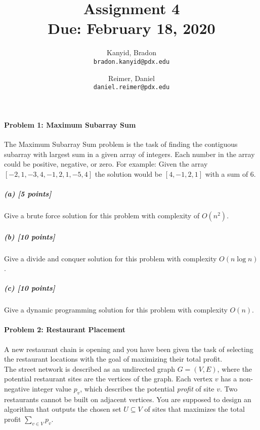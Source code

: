\documentclass[11pt]{article}
\title{\bf Assignment 4 \\[2ex]
\rm\normalsize Due: February 18, 2020}
\date{}
\author{
  Kanyid, Bradon\\
  \texttt{bradon.kanyid@pdx.edu}
  \and
  Reimer, Daniel\\
  \texttt{daniel.reimer@pdx.edu}
}
\begin{document}
\maketitle

\begin{center}
\end{center}

\paragraph{Problem 1: Maximum Subarray Sum}
The Maximum Subarray Sum problem is the task of finding the contiguous subarray with largest sum in a given array of integers.
Each number in the array could be positive, negative, or zero. For example: Given the array $[-2, 1, -3, 4, -1, 2, 1, -5, 4]$
the solution would be $[4, -1, 2, 1]$ with a sum of 6.

\subparagraph{(a) [5 points]}
Give a brute force solution for this problem with complexity of $O(n^2)$.


\subparagraph{(b) [10 points]}
Give a divide and conquer solution for this problem with complexity $O(n \log n)$.


\subparagraph{(c) [10 points]}
Give a dynamic programming solution for this problem with complexity $O(n)$.


\paragraph{Problem 2: Restaurant Placement}
A new restaurant chain is opening and you have been given the task of selecting the restaurant locations with the
goal of maximizing their total profit.\\

The street network is described as an undirected graph $G=(V,E)$, where the
potential restaurant sites are the vertices of the graph. Each vertex $v$ has a non-negative integer value $p_v$,
which describes the potential {\em profit} of site $v$. Two restaurants cannot be built on adjacent vertices.
You are supposed to design an algorithm that outputs the chosen set $U \subseteq V$ of sites that maximizes the total
profit $\sum_{v \in V} p_v$.\\
\end{document}

